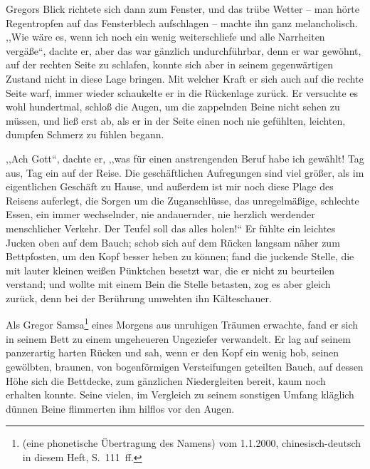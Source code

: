 \documentclass[prepress]{zchinr}
\begin{document}
Gregors Blick richtete sich dann zum Fenster, und das trübe Wetter -- man hörte Regentropfen auf das Fensterblech aufschlagen -- machte ihn ganz melancholisch. ,,Wie wäre es, wenn ich noch ein wenig weiterschliefe und alle Narrheiten vergäße``, dachte er, aber das war gänzlich undurchführbar, denn er war gewöhnt, auf der rechten Seite zu schlafen, konnte sich aber in seinem gegenwärtigen Zustand nicht in diese Lage bringen. Mit welcher Kraft er sich auch auf die rechte Seite warf, immer wieder schaukelte er in die Rückenlage zurück. Er versuchte es wohl hundertmal, schloß die Augen, um die zappelnden Beine nicht sehen zu müssen, und ließ erst ab, als er in der Seite einen noch nie gefühlten, leichten, dumpfen Schmerz zu fühlen begann.

,,Ach Gott``, dachte er, ,,was für einen anstrengenden Beruf habe ich gewählt! Tag aus, Tag ein auf der Reise. Die geschäftlichen Aufregungen sind viel größer, als im eigentlichen Geschäft zu Hause, und außerdem ist mir noch diese Plage des Reisens auferlegt, die Sorgen um die Zuganschlüsse, das unregelmäßige, schlechte Essen, ein immer wechselnder, nie andauernder, nie herzlich werdender menschlicher Verkehr. Der Teufel soll das alles holen!{}`` Er fühlte ein leichtes Jucken oben auf dem Bauch; schob sich auf dem Rücken langsam näher zum Bettpfosten, um den Kopf besser heben zu können; fand die juckende Stelle, die mit lauter kleinen weißen Pünktchen besetzt war, die er nicht zu beurteilen verstand; und wollte mit einem Bein die Stelle betasten, zog es aber gleich zurück, denn bei der Berührung umwehten ihn Kälteschauer.



\printtitle

Als Gregor Samsa\footnote{ (eine phonetische Übertragung des Namens) vom 1.1.2000, chinesisch-deutsch in diesem Heft, S.~111~ff.} eines Morgens aus unruhigen Träumen erwachte, fand er sich in seinem Bett zu einem ungeheueren Ungeziefer verwandelt. Er lag auf seinem panzerartig harten Rücken und sah, wenn er den Kopf ein wenig hob, seinen gewölbten, braunen, von bogenförmigen Versteifungen geteilten Bauch, auf dessen Höhe sich die Bettdecke, zum gänzlichen Niedergleiten bereit, kaum noch erhalten konnte. Seine vielen, im Vergleich zu seinem sonstigen Umfang kläglich dünnen Beine flimmerten ihm hilflos vor den Augen.
\end{document}

